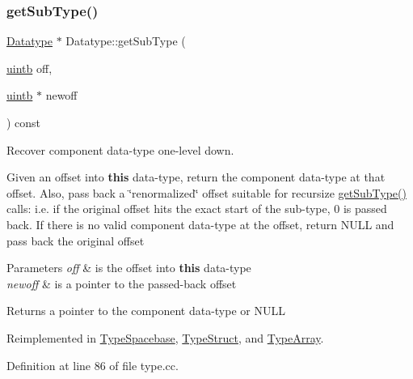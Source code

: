 \subsubsection{\texorpdfstring{getSubType()}{getSubType()}}
{\footnotesize\ttfamily \mbox{\hyperlink{class_datatype}{Datatype}} $\ast$ Datatype\+::get\+Sub\+Type (\begin{DoxyParamCaption}\item[{\mbox{\hyperlink{types_8h_a2db313c5d32a12b01d26ac9b3bca178f}{uintb}}}]{off,  }\item[{\mbox{\hyperlink{types_8h_a2db313c5d32a12b01d26ac9b3bca178f}{uintb}} $\ast$}]{newoff }\end{DoxyParamCaption}) const\hspace{0.3cm}{\ttfamily [virtual]}}



Recover component data-\/type one-\/level down. 

Given an offset into {\bfseries{this}} data-\/type, return the component data-\/type at that offset. Also, pass back a \char`\"{}renormalized\char`\"{} offset suitable for recursize \mbox{\hyperlink{class_datatype_ac310ccfdc47d145f10699fa1e14e73b4}{get\+Sub\+Type()}} calls\+: i.\+e. if the original offset hits the exact start of the sub-\/type, 0 is passed back. If there is no valid component data-\/type at the offset, return N\+U\+LL and pass back the original offset 
\begin{DoxyParams}{Parameters}
{\em off} & is the offset into {\bfseries{this}} data-\/type \\
\hline
{\em newoff} & is a pointer to the passed-\/back offset \\
\hline
\end{DoxyParams}
\begin{DoxyReturn}{Returns}
a pointer to the component data-\/type or N\+U\+LL 
\end{DoxyReturn}


Reimplemented in \mbox{\hyperlink{class_type_spacebase_a0dc2b2f9eadee2b8c79e2403a9c908fe}{Type\+Spacebase}}, \mbox{\hyperlink{class_type_struct_abf638d0fc1902b030f0134c5152a3818}{Type\+Struct}}, and \mbox{\hyperlink{class_type_array_a47579d472b40e0cdf7ecb95da258e870}{Type\+Array}}.



Definition at line 86 of file type.\+cc.

